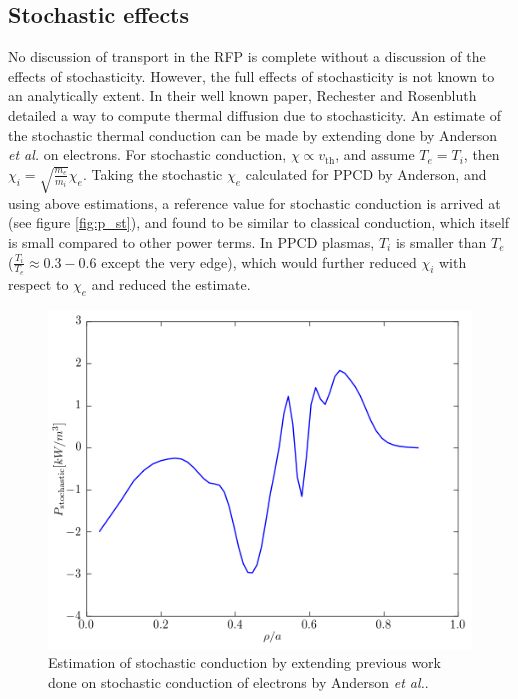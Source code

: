 \begin{refsection}
\subsection{Stochastic effects}\label{sec:stochastic_effects}
No discussion of transport in the RFP is complete without a discussion of the effects of stochasticity. However, the full effects of stochasticity is not known to an analytically extent. In their well known paper, Rechester and Rosenbluth\cite{Rechester1978} detailed a way to compute thermal diffusion due to stochasticity. An estimate of the stochastic thermal conduction can be made by extending done by Anderson \textit{et al.}\cite{Anderson2005} on electrons. For stochastic conduction, $\chi \propto v_{\text{th}}$, and assume $T_e = T_i$, then $\chi_i = \sqrt{\frac{m_e}{m_i}}\chi_e$. Taking the stochastic $\chi_e$ calculated for PPCD by Anderson, and using above estimations, a reference value for stochastic conduction is arrived at (see figure \ref{fig:p_st}), and found to be similar to classical conduction, which itself is small compared to other power terms. In PPCD plasmas, $T_i$ is smaller than $T_e$ ($\frac{T_i}{T_e} \approx 0.3-0.6$ except the very edge), which would further reduced $\chi_i$ with respect to $\chi_e$ and reduced the estimate. 
\begin{figure}[!htb]
	\centering
	\includegraphics[width = 0.75\linewidth]{./transport_modeling/p_st.png}
    \caption[Estimation of stochastic conduction]{Estimation of stochastic conduction by extending previous work done on stochastic conduction of electrons by Anderson \textit{et al.}\cite{Anderson2005}.}
\end{figure}%


\end{refsection}
